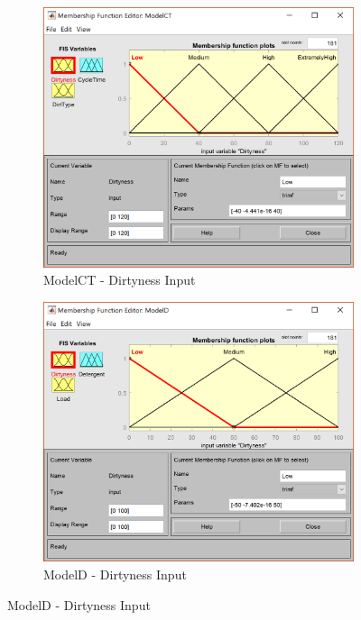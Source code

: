 \documentclass[11pt]{article}
\begin{document}
\begin{enumerate}[label=(\alph*)]
  \begin{figure}[ht!]
  \centering
  \begin{subfigure}{.5\textwidth}
    \centering
    \includegraphics[width=.9\linewidth]{res/image1_dirtyness}
    \caption{ModelCT - Dirtyness Input}
    \label{fig:sub1}
  \end{subfigure}%
  \begin{subfigure}{.5\textwidth}
    \centering
    \includegraphics[width=.9\linewidth]{res/image2_dirtyness}
    \caption{ModelD - Dirtyness Input}
    \label{fig:sub2}
  \end{subfigure}
  \end{figure}


\end{enumerate}
\end{document}
